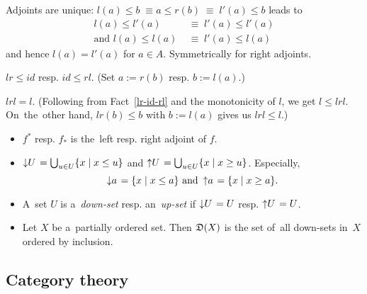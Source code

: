 \begin{rem}
  Adjoints are unique: $l(a) \le b \; \equiv a \le r(b) \; \equiv \; l'(a) \le
  b$ leads to
  \begin{align*}
    l(a) \le l'(a) \; &\equiv \; l'(a) \le l'(a) \\
    \text{and } l(a) \le l(a) \; &\equiv \; l'(a) \le l(a)
  \end{align*}
  and hence $l(a) = l'(a)$ for $a\in A$.
  Symmetrically for right adjoints.
\end{rem}

\begin{fact} \label{lr-id-rl}
  $lr \le id$ resp. $id \le rl$.
  (Set $a := r(b)$ resp. $b := l(a)$.)
\end{fact}

\begin{fact} \label{lrl=l}
  $lrl = l$.
  (Following from Fact~\ref{lr-id-rl} and the monotonicity of $l$, we get $l
   \le lrl$.
  On~the~other hand, $lr(b) \le b$ with $b := l(a)$ gives us $lrl \le l$.)
\end{fact}

\begin{itemize}
\item $f^*$ resp. $f_*$ is the~left resp. right adjoint of $f$.

\item $\left\downarrow U \right. = \bigcup_{u\in U} \{x \mid x \le u\}$ and
$\left\uparrow U \right. = \bigcup_{u\in U} \{x \mid x \ge u\}$.
Especially,
\[
  \left\downarrow a \right. = \{x \mid x \le a\} \text{ and } \left\uparrow a
  \right. = \{x \mid x \ge a\}.
\]

\item A~set $U$ is a~\emph{down-set\/} resp. an~\emph{up-set\/} if
$\left\downarrow U \right. = U$ resp. $\left\uparrow U \right. = U$.

\item Let $X$ be a~partially ordered set.
Then $\mathfrak{D}(X)$ is the set of~all down-sets in~$X$ ordered by inclusion.

\end{itemize}

\subsection*{Category theory}

